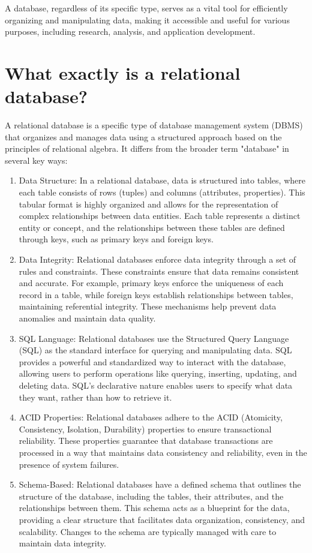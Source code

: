 A database, regardless of its specific type, serves as a vital tool for efficiently organizing and manipulating data, making it accessible and useful for various purposes, including research, analysis, and application development.

\section{What exactly is a relational database?}
A relational database is a specific type of database management system (DBMS) that organizes and manages data using a structured approach based on the principles of relational algebra. It differs from the broader term "database" in several key ways:

\begin{enumerate}
    \item Data Structure: In a relational database, data is structured into tables, where each table consists of rows (tuples) and columns (attributes, properties). This tabular format is highly organized and allows for the representation of complex relationships between data entities. Each table represents a distinct entity or concept, and the relationships between these tables are defined through keys, such as primary keys and foreign keys.
    \item Data Integrity: Relational databases enforce data integrity through a set of rules and constraints. These constraints ensure that data remains consistent and accurate. For example, primary keys enforce the uniqueness of each record in a table, while foreign keys establish relationships between tables, maintaining referential integrity. These mechanisms help prevent data anomalies and maintain data quality.
    \item SQL Language: Relational databases use the Structured Query Language (SQL) as the standard interface for querying and manipulating data. SQL provides a powerful and standardized way to interact with the database, allowing users to perform operations like querying, inserting, updating, and deleting data. SQL's declarative nature enables users to specify what data they want, rather than how to retrieve it.
    \item ACID Properties: Relational databases adhere to the ACID (Atomicity, Consistency, Isolation, Durability) properties to ensure transactional reliability. These properties guarantee that database transactions are processed in a way that maintains data consistency and reliability, even in the presence of system failures.
    \item Schema-Based: Relational databases have a defined schema that outlines the structure of the database, including the tables, their attributes, and the relationships between them. This schema acts as a blueprint for the data, providing a clear structure that facilitates data organization, consistency, and scalability. Changes to the schema are typically managed with care to maintain data integrity.
\end{enumerate}


